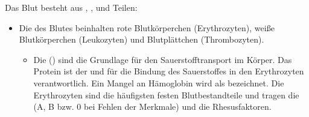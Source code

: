 {%
Das Blut besteht aus , ,  und  Teilen:
\begin{itemize}
  \item Die  des Blutes beinhalten rote Blutkörperchen
  (Erythrozyten), weiße Blutkörperchen (Leukozyten) und Blutplättchen
  (Thrombozyten).
\begin{itemize}
  \item
  \label{topic:erythrozyten}%
  \label{topic:haemoglobin}
  Die  () sind die Grundlage für den Sauerstofftransport
  im Körper. 
  Das Protein  ist der  und für die
  Bindung des Sauerstoffes in den Erythrozyten verantwortlich. 
  Ein Mangel an Hämoglobin wird als
   bezeichnet.
  Die Erythrozyten sind die häufigsten festen
  Blutbestandteile  und tragen die
   (A, B bzw. 0 bei Fehlen der
  Merkmale) und die Rhesusfaktoren. 
  

\end{itemize}
\end{itemize}}
